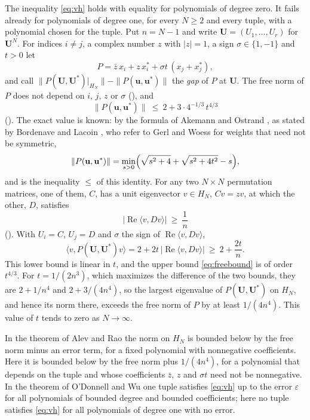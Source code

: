 \documentclass[11pt]{article}
\theoremstyle{remark}
\begin{document}
The inequality \eqref{eq:vh} holds with equality for polynomials of degree zero. It fails already for polynomials
of degree one, for every $N\ge 2$ and every tuple, with a polynomial chosen for the tuple. Put $n=N-1$ and write $\mathbf U=(U_1,\dots,U_r)$ for
$\mathbf U^N$. For indices $i\ne j$, a complex
number $z$ with $|z|=1$, a sign $\sigma\in\{1,-1\}$ and $t>0$ let
\begin{equation}\label{eq:P}
  P=\bar z\,x_i+z\,x_i^*+\sigma t\,(x_j+x_j^*),
\end{equation}
and call $\|P(\mathbf U,\mathbf U^*)|_{H_N}\|-\|P(\mathbf u,\mathbf u^*)\|$ the \emph{gap} of $P$ at $\mathbf U$.
The free norm of $P$ does not depend on $i$, $j$, $z$ or $\sigma$ (), and
\begin{equation}\label{eq:freebound}
  \|P(\mathbf u,\mathbf u^*)\|\ \le\ 2+3\cdot 4^{-1/3}\,t^{4/3}
\end{equation}
(). The exact value is known: by the formula of Akemann and Ostrand \cite{AO}, as stated by
Bordenave and Lacoin \cite[(62)]{BL}, who refer to Gerl and Woess \cite[(2.6)]{GW} for weights that need not be
symmetric,
\[
  \|P(\mathbf u,\mathbf u^*)\|=\min_{s>0}\Bigl(\sqrt{s^2+4}+\sqrt{s^2+4t^2}-s\Bigr),
\]
and  is the inequality $\le$ of this identity. For any two $N\times N$ permutation matrices,
one of them, $C$, has a unit eigenvector
$v\in H_N$, $Cv=zv$, at which the other, $D$, satisfies
\[
  |\operatorname{Re}\langle v,Dv\rangle|\ \ge\ \frac1n
\]
(). With $U_i=C$, $U_j=D$ and $\sigma$ the sign of $\operatorname{Re}\langle v,Dv\rangle$,
\[
  \langle v,P(\mathbf U,\mathbf U^*)v\rangle=2+2t\,|\operatorname{Re}\langle v,Dv\rangle|\ \ge\ 2+\frac{2t}n .
\]
This lower bound is linear in $t$, and the upper bound \eqref{eq:freebound} is of order $t^{4/3}$. For
$t=1/(2n^3)$, which maximizes the difference of the two bounds, they
are $2+1/n^4$ and $2+3/(4n^4)$, so the largest eigenvalue of $P(\mathbf U,\mathbf U^*)$ on $H_N$, and hence its
norm there, exceeds the free norm of $P$ by at least $1/(4n^4)$. This value of $t$ tends to zero as $N\to\infty$.

In the theorem of Alev and Rao the norm on $H_N$ is
bounded below by the free norm minus an error term, for a fixed polynomial with nonnegative coefficients. Here it
is bounded below by the free norm plus $1/(4n^4)$, for a polynomial that depends on the tuple and whose
coefficients $\bar z$, $z$ and $\sigma t$ need not be nonnegative. In the theorem of O'Donnell and Wu one tuple satisfies \eqref{eq:vh} up to the error $\varepsilon$ for all
polynomials of bounded degree and bounded coefficients; here no tuple satisfies \eqref{eq:vh} for all polynomials of
degree one with no error.
\end{document}
